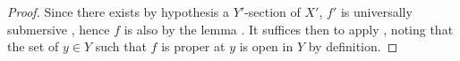 \begin{proof}
Since there exists by hypothesis a $Y'$-section of $X'$, $f'$ is universally submersive , hence $f$ is also by the lemma .
It suffices then to apply , noting that the set of $y\in Y$ such that $f$ is proper at $y$ is open in $Y$ by definition.
\end{proof}


